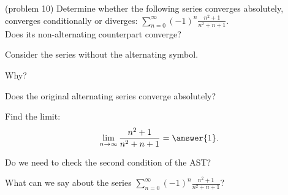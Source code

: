\documentclass[handout]{ximera}
\begin{document}
\begin{problem}(problem 10)
Determine whether the following series converges absolutely, converges conditionally 
or diverges: $\displaystyle{\sum_{n=0}^\infty (-1)^n \frac{n^2 + 1}{n^2 + n + 1}}$.\\
Does its non-alternating counterpart converge?
\begin{hint} 
Consider the series without the alternating symbol.
\end{hint}
\begin{multipleChoice}
\end{multipleChoice}

Why?
\begin{multipleChoice}
\end{multipleChoice}




Does the original alternating series converge absolutely?
\begin{multipleChoice}
\end{multipleChoice}



Find the limit:
\[
\lim_{n\to\infty} \frac{n^2 + 1}{n^2 + n + 1} = \answer{1}.
\]

Do we need to check the second condition of the AST?
\begin{multipleChoice}
\end{multipleChoice}


What can we say about the series $\displaystyle{\sum_{n=0}^\infty (-1)^n \frac{n^2 + 1}{n^2 + n + 1}}$?
\begin{multipleChoice}
\end{multipleChoice}

\end{problem}
\end{document}
